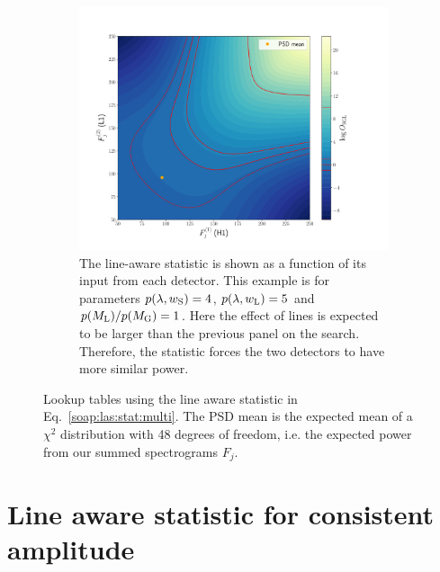 \begin{figure}
\begin{subfigure}[h]{\linewidth}
\begin{minipage}{0.65\linewidth}
\includegraphics[width=0.9\columnwidth]{C3_soap/lookup_linebig.pdf}
\end{minipage}\hfill
\begin{minipage}{0.35\linewidth}
\caption{The line-aware statistic is shown as a function of its input from each detector. This example is for parameters $p(\lambda,w_{\rm{S}}) = 4$, $p(\lambda,w_{\rm{L}}) = 5$ and $p(M_{\rm{L}})/p(M_{\rm{G}}) = 1$. Here the effect of lines is expected to be larger than the previous panel on the search. Therefore, the statistic forces the two detectors to have more similar power.}
\label{soap:las:detp:linebig}
\end{minipage}
\end{subfigure}
\caption[Lookup table for line aware statistic.]{Lookup tables using the line aware statistic in Eq.~\ref{soap:las:stat:multi}. The \gls{PSD} mean is the expected mean of a $\chi^2$ distribution with 48 degrees of freedom, i.e. the expected power from our summed spectrograms $F_j$.}
\label{soap:las:osgl_plots}
\end{figure}


\section{\label{soap:lineawareamp}Line aware statistic for consistent amplitude}


